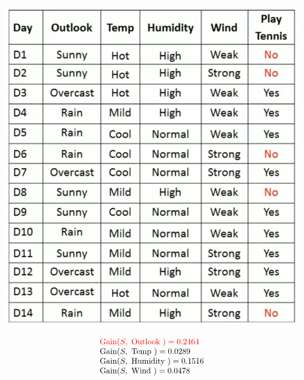 \documentclass[9pt,dvipsnames]{beamer}
\begin{document}
	\begin{frame}
		\begin{columns}
			\includegraphics[width=\textwidth]{imgs/algorithm_9.png}
			$$
			\begin{array}{l}\textcolor{red}{\operatorname{Gain}(S, \text { Outlook })=0.2464} \\ \operatorname{Gain}(S, \text { Temp })=0.0289 \\ \operatorname{Gain}(S, \text { Humidity })=0.1516 \\ \operatorname{Gain}(S, \text { Wind })=0.0478\end{array}
			$$
		\end{columns}
	\end{frame}
	
\end{document}
